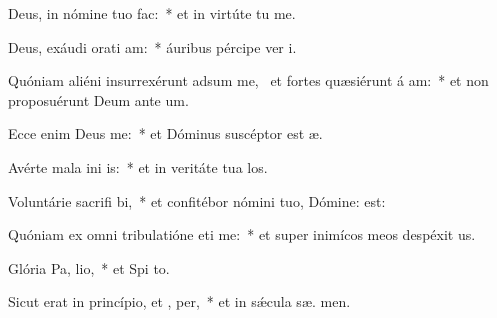 \item Deus, in nómine tuo   fac:~* et in virtúte tu  me.
\item Deus, exáudi orati am:~* áuribus pércipe ver  i.
\item Quóniam aliéni insurrexérunt adsum me,~\pscross{} et fortes quæsiérunt á am:~* et non proposuérunt Deum ante  um.
\item Ecce enim Deus  me:~* et Dóminus suscéptor est  æ.
\item Avérte mala ini is:~* et in veritáte tua  los.
\item Voluntárie sacrifi bi,~* et confitébor nómini tuo, Dómine:   est:
\item Quóniam ex omni tribulatióne eti me:~* et super inimícos meos despéxit  us.
\item Glória Pa,  lio,~* et Spi to.
\item Sicut erat in princípio, et ,  per,~* et in sǽcula sæ. men.

